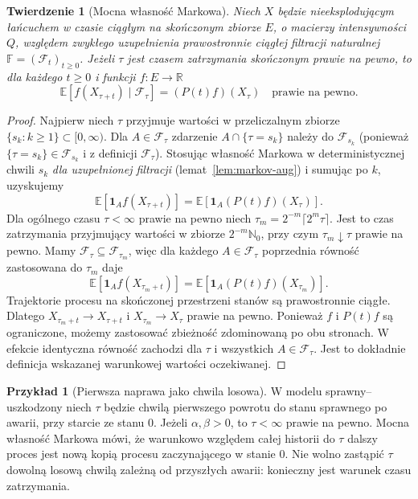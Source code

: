 \documentclass[11pt,a4paper,oneside]{report}
\numberwithin{equation}{chapter}
\theoremstyle{plain}
\newtheorem{twierdzenie}{Twierdzenie}[chapter]
\theoremstyle{definition}
\newtheorem{przyklad}{Przykład}[chapter]
\theoremstyle{remark}
\newcommand{\R}{\mathbb{R}}
\newcommand{\N}{\mathbb{N}}
\newcommand{\E}{\mathbb{E}}
\newcommand{\calF}{\mathcal{F}}
\newcommand{\ind}[1]{\mathbf{1}_{#1}}
\begin{document}
\begin{twierdzenie}[Mocna własność Markowa]
\label{thm:ctmc-strong}
Niech $X$ będzie nieeksplodującym łańcuchem w czasie
ciągłym na skończonym zbiorze $E$, o macierzy intensywności
$Q$, względem zwykłego uzupełnienia prawostronnie ciągłej
filtracji naturalnej $\mathbb F=(\calF_t)_{t\ge0}$.
Jeżeli $\tau$ jest czasem zatrzymania skończonym prawie na
pewno, to dla każdego $t\ge0$ i funkcji $f:E\to\R$
\[
\E[f(X_{\tau+t})\mid\calF_\tau]=(P(t)f)(X_\tau)
\quad\text{prawie na pewno}.
\]
\end{twierdzenie}
\begin{proof}
Najpierw niech $\tau$ przyjmuje wartości w przeliczalnym
zbiorze $\{s_k:k\ge1\}\subset[0,\infty)$.
Dla $A\in\calF_\tau$ zdarzenie
$A\cap\{\tau=s_k\}$ należy do $\calF_{s_k}$
(ponieważ $\{\tau=s_k\}\in\calF_{s_k}$ i z definicji
$\calF_\tau$).
Stosując własność Markowa w deterministycznej chwili $s_k$
\emph{dla uzupełnionej filtracji} (lemat~\ref{lem:markov-aug})
i sumując po $k$, uzyskujemy
\[
\E[\ind A f(X_{\tau+t})]
=\E[\ind A(P(t)f)(X_\tau)].
\]
Dla ogólnego czasu $\tau<\infty$ prawie na pewno niech
$\tau_m=2^{-m}\lceil2^m\tau\rceil$.
Jest to czas zatrzymania przyjmujący wartości w zbiorze
$2^{-m}\N_0$, przy czym $\tau_m\downarrow\tau$
prawie na pewno. Mamy $\calF_\tau\subseteq\calF_{\tau_m}$,
więc dla każdego $A\in\calF_\tau$ poprzednia równość
zastosowana do $\tau_m$ daje
\[
\E[\ind A f(X_{\tau_m+t})]
=\E[\ind A(P(t)f)(X_{\tau_m})].
\]
Trajektorie procesu na skończonej przestrzeni stanów są
prawostronnie ciągłe. Dlatego
$X_{\tau_m+t}\to X_{\tau+t}$ i $X_{\tau_m}\to X_\tau$
prawie na pewno. Ponieważ $f$ i $P(t)f$ są ograniczone,
możemy zastosować zbieżność zdominowaną po obu stronach.
W efekcie identyczna równość zachodzi dla $\tau$ i wszystkich
$A\in\calF_\tau$. Jest to dokładnie definicja wskazanej
warunkowej wartości oczekiwanej.
\end{proof}

\begin{przyklad}[Pierwsza naprawa jako chwila losowa]
W modelu sprawny--uszkodzony niech $\tau$ będzie chwilą
pierwszego powrotu do stanu sprawnego po awarii, przy starcie
ze stanu $0$. Jeżeli $\alpha,\beta>0$, to $\tau<\infty$
prawie na pewno. Mocna własność Markowa mówi, że warunkowo
względem całej historii do $\tau$ dalszy proces jest
nową kopią procesu zaczynającego w stanie $0$.
Nie wolno zastąpić $\tau$ dowolną losową chwilą zależną
od przyszłych awarii: konieczny jest warunek czasu zatrzymania.
\end{przyklad}
\end{document}
